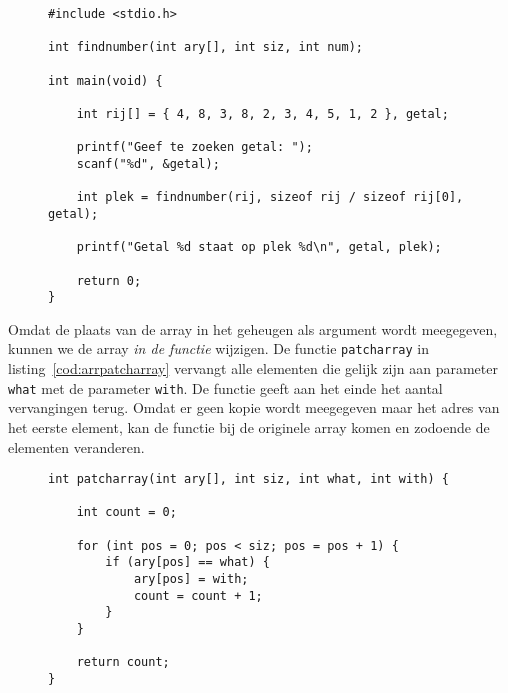 \begin{figure}[!ht]
\begin{lstlisting}[caption=Aanroepen van de functie \texttt{findnumber}.,label=cod:arrfindnumber2]
#include <stdio.h>

int findnumber(int ary[], int siz, int num);

int main(void) {

    int rij[] = { 4, 8, 3, 8, 2, 3, 4, 5, 1, 2 }, getal;

    printf("Geef te zoeken getal: ");
    scanf("%d", &getal);
    
    int plek = findnumber(rij, sizeof rij / sizeof rij[0], getal);

    printf("Getal %d staat op plek %d\n", getal, plek);

    return 0;
}
\end{lstlisting}
\end{figure}

Omdat de plaats van de array in het geheugen als argument wordt meegegeven, kunnen we de array \textsl{in de functie} wijzigen. De functie \texttt{patcharray} in listing~\ref{cod:arrpatcharray} vervangt alle elementen die gelijk zijn aan parameter \texttt{what} met de parameter \texttt{with}. De functie geeft aan het einde het aantal vervangingen terug. Omdat er geen kopie wordt meegegeven maar het adres van het eerste element, kan de functie bij de originele array komen en zodoende de elementen veranderen.

\begin{figure}[!ht]
\begin{lstlisting}[caption=Functie om een getal te vervangen door een ander getal.,label=cod:arrpatcharray]
int patcharray(int ary[], int siz, int what, int with) {

    int count = 0;

    for (int pos = 0; pos < siz; pos = pos + 1) {
        if (ary[pos] == what) {
            ary[pos] = with;
            count = count + 1;
        }
    }
    
    return count;
}
\end{lstlisting}
\end{figure}



